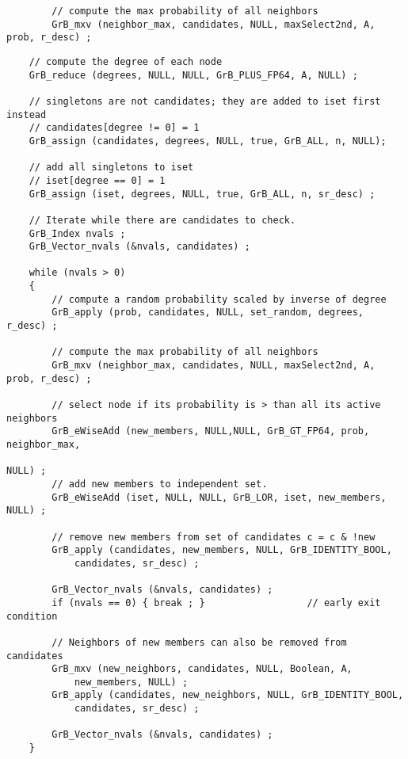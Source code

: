 \documentclass[12pt]{article}
\begin{document}
        {\footnotesize
        \begin{verbatim}
        // compute the max probability of all neighbors
        GrB_mxv (neighbor_max, candidates, NULL, maxSelect2nd, A, prob, r_desc) ; \end{verbatim}}

\newpage
\begin{mdframed}[userdefinedwidth=6in]
{\footnotesize
\begin{verbatim}
    // compute the degree of each node
    GrB_reduce (degrees, NULL, NULL, GrB_PLUS_FP64, A, NULL) ;

    // singletons are not candidates; they are added to iset first instead
    // candidates[degree != 0] = 1
    GrB_assign (candidates, degrees, NULL, true, GrB_ALL, n, NULL); 

    // add all singletons to iset
    // iset[degree == 0] = 1
    GrB_assign (iset, degrees, NULL, true, GrB_ALL, n, sr_desc) ; 

    // Iterate while there are candidates to check.
    GrB_Index nvals ;
    GrB_Vector_nvals (&nvals, candidates) ;

    while (nvals > 0)
    {
        // compute a random probability scaled by inverse of degree
        GrB_apply (prob, candidates, NULL, set_random, degrees, r_desc) ;

        // compute the max probability of all neighbors
        GrB_mxv (neighbor_max, candidates, NULL, maxSelect2nd, A, prob, r_desc) ;

        // select node if its probability is > than all its active neighbors
        GrB_eWiseAdd (new_members, NULL,NULL, GrB_GT_FP64, prob, neighbor_max,
                                                                        NULL) ;
        // add new members to independent set.
        GrB_eWiseAdd (iset, NULL, NULL, GrB_LOR, iset, new_members, NULL) ;

        // remove new members from set of candidates c = c & !new
        GrB_apply (candidates, new_members, NULL, GrB_IDENTITY_BOOL,
            candidates, sr_desc) ;

        GrB_Vector_nvals (&nvals, candidates) ;
        if (nvals == 0) { break ; }                  // early exit condition

        // Neighbors of new members can also be removed from candidates
        GrB_mxv (new_neighbors, candidates, NULL, Boolean, A,
            new_members, NULL) ;
        GrB_apply (candidates, new_neighbors, NULL, GrB_IDENTITY_BOOL,
            candidates, sr_desc) ;

        GrB_Vector_nvals (&nvals, candidates) ;
    }
\end{verbatim}}
\end{mdframed}
\end{document}
